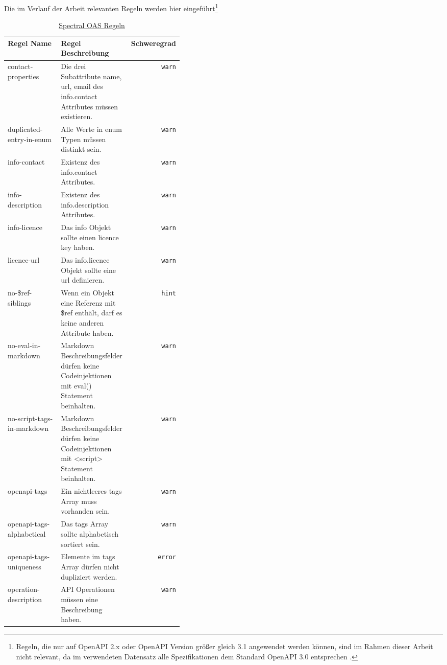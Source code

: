 Die im Verlauf der Arbeit relevanten Regeln werden hier eingeführt\footnote{Regeln, die nur auf OpenAPI 2.x  oder OpenAPI Version größer gleich 3.1 angewendet werden können, sind im Rahmen dieser Arbeit nicht relevant, da im verwendeten Datensatz alle Spezifikationen dem Standard OpenAPI 3.0 entsprechen \parencite{apisguru_openapi_2024}.}
{\footnotesize 
  \begin{longtable}{lp{0.4\linewidth}r}
    \caption{\normalsize \href{https://docs.stoplight.io/docs/spectral/4dec24461f3af-open-api-rules}{Spectral OAS Regeln}}
    \label{tab:OASRules}
    \endfirsthead
    \endhead
    \textbf{Regel Name} & \textbf{Regel Beschreibung} & \textbf{Schweregrad} \\ \hline \hline
    contact-properties & Die drei Subattribute name, url, email des info.contact Attributes müssen existieren. & \texttt{warn} \\
    duplicated-entry-in-enum & Alle Werte in enum Typen müssen distinkt sein. & \texttt{warn}\\
    info-contact &  Existenz des info.contact Attributes. & \texttt{warn}\\
    info-description & Existenz des info.description Attributes. & \texttt{warn}\\
    info-licence & Das info Objekt sollte einen licence key haben. & \texttt{warn}\\
    licence-url & Das info.licence Objekt sollte eine url definieren. & \texttt{warn} \\
    no-\$ref-siblings & Wenn ein Objekt eine Referenz mit \$ref enthält, darf es keine anderen Attribute haben. & \texttt{hint}\\
    no-eval-in-markdown & Markdown Beschreibungsfelder dürfen keine Codeinjektionen mit eval() Statement beinhalten. & \texttt{warn}\\
    no-script-tags-in-markdown & Markdown Beschreibungsfelder dürfen keine Codeinjektionen mit <script> Statement beinhalten. & \texttt{warn}\\
    openapi-tags & Ein nichtleeres tags Array muss vorhanden sein. & \texttt{warn} \\
    openapi-tags-alphabetical & Das tags Array sollte alphabetisch sortiert sein. & \texttt{warn} \\
    openapi-tags-uniqueness & Elemente im tags Array dürfen nicht dupliziert werden. & \texttt{error}\\
    operation-description & API Operationen müssen eine Beschreibung haben. & \texttt{warn}\\

\end{longtable}}
